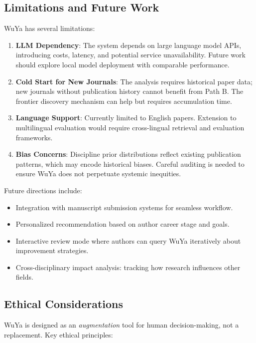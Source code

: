 \subsection{Limitations and Future Work}

WuYa has several limitations:

\begin{enumerate}
    \item \textbf{LLM Dependency}: The system depends on large language model APIs, introducing costs, latency, and potential service unavailability. Future work should explore local model deployment with comparable performance.

    \item \textbf{Cold Start for New Journals}: The \dea{} analysis requires historical paper data; new journals without publication history cannot benefit from Path B. The frontier discovery mechanism can help but requires accumulation time.

    \item \textbf{Language Support}: Currently limited to English papers. Extension to multilingual evaluation would require cross-lingual retrieval and evaluation frameworks.

    \item \textbf{Bias Concerns}: Discipline prior distributions reflect existing publication patterns, which may encode historical biases. Careful auditing is needed to ensure WuYa does not perpetuate systemic inequities.
\end{enumerate}

Future directions include:
\begin{itemize}
    \item Integration with manuscript submission systems for seamless workflow.
    \item Personalized recommendation based on author career stage and goals.
    \item Interactive review mode where authors can query WuYa iteratively about improvement strategies.
    \item Cross-disciplinary impact analysis: tracking how research influences other fields.
\end{itemize}

\subsection{Ethical Considerations}

WuYa is designed as an \textit{augmentation} tool for human decision-making, not a replacement. Key ethical principles:

